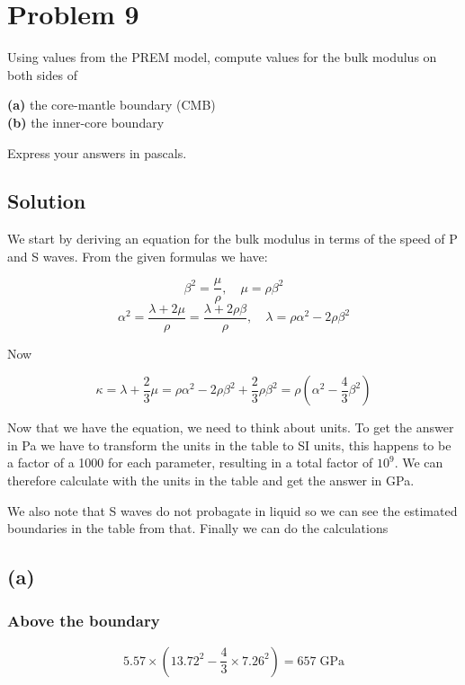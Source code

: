 \section*{Problem 9}

Using values from the PREM model, compute values for the bulk modulus on both sides of 

\textbf{(a)} the core-mantle boundary (CMB)\\
\textbf{(b)} the inner-core boundary 

Express your answers in pascals.

\subsection*{Solution}

We start by deriving an equation for the bulk modulus in terms of the speed of P and S waves. From the given formulas we have:

\begin{equation*}
    \beta^2 = \frac{\mu}{\rho}, \quad \mu = \rho \beta^2
\end{equation*}
\begin{equation*}
    \alpha^2 = \frac{\lambda + 2 \mu}{\rho} = \frac{\lambda + 2 \rho \beta}{\rho}, \quad \lambda = \rho \alpha^2 - 2 \rho \beta^2
\end{equation*}

Now

\begin{equation*}
    \kappa = \lambda + \frac{2}{3} \mu = 
    \rho \alpha^2 - 2 \rho \beta^2 + \frac{2}{3} \rho \beta^2 = 
    \rho(\alpha^2 - \frac{4}{3} \beta^2)
\end{equation*}

Now that we have the equation, we need to think about units. To get the answer in Pa we have to transform the units in the table to SI units, this happens to be a factor of a 1000 for each parameter, resulting in a total factor of $10^{9}$. We can therefore calculate with the units in the table and get the answer in GPa.

We also note that S waves do not probagate in liquid so we can see the estimated boundaries in the table from that. Finally we can do the calculations

\subsection*{(a)}
\subsubsection*{Above the boundary}
\begin{equation*}
    5.57\times(13.72^2 - \frac{4}{3}\times 7.26^2) = 657 \; \text{GPa}
\end{equation*}


